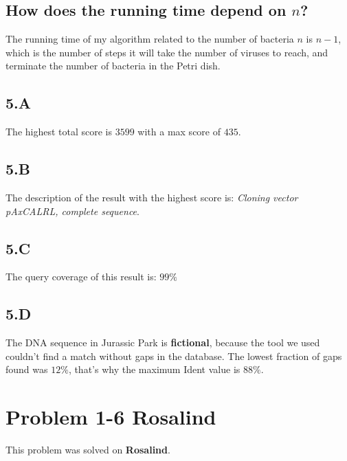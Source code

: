 \documentclass{article}
\begin{document}
\subsection*{How does the running time depend on $n$?}

The running time of my algorithm related to the number of bacteria $n$ is $n-1$, which is the number of steps it will take the number of viruses to reach, and terminate the number of bacteria in the Petri dish.

\subsection*{5.A}
The highest total score is $3599$ with a max score of $435$.

\subsection*{5.B}
The description of the result with the highest score is: \textit{Cloning vector pAxCALRL, complete sequence}.

\subsection*{5.C}
The query coverage of this result is: $99\%$

\subsection*{5.D}
The DNA sequence in Jurassic Park is \textbf{fictional}, because the tool we used couldn't find a match without gaps in the database. The lowest fraction of gaps found was $12\%$, that's why the maximum Ident value is $88\%$.

\section*{Problem 1-6 Rosalind}

This problem was solved on \textbf{Rosalind}.
\end{document}
